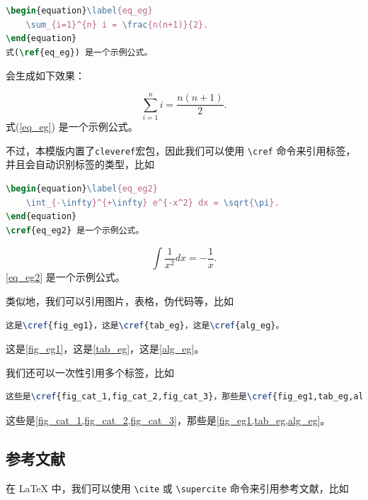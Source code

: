 \begin{lstlisting}[language=TeX]
\begin{equation}\label{eq_eg}
    \sum_{i=1}^{n} i = \frac{n(n+1)}{2}.
\end{equation}
式(\ref{eq_eg}) 是一个示例公式。
\end{lstlisting}

\noindent 会生成如下效果：

\begin{equation}\label{eq_eg}
    \sum_{i=1}^{n} i = \frac{n(n+1)}{2}.
\end{equation}
式(\ref{eq_eg}) 是一个示例公式。

不过，本模版内置了\texttt{cleveref}宏包，因此我们可以使用 \texttt{\textbackslash cref} 命令来引用标签，并且会自动识别标签的类型，比如

\begin{lstlisting}[language=TeX]
\begin{equation}\label{eq_eg2}
    \int_{-\infty}^{+\infty} e^{-x^2} dx = \sqrt{\pi}.
\end{equation}
\cref{eq_eg2} 是一个示例公式。
\end{lstlisting}

\begin{equation}\label{eq_eg2}
    \int \frac{1}{x^2} dx = -\frac{1}{x}.
\end{equation}
\cref{eq_eg2} 是一个示例公式。

类似地，我们可以引用图片，表格，伪代码等，比如

\begin{lstlisting}[language=TeX]
这是\cref{fig_eg1}，这是\cref{tab_eg}，这是\cref{alg_eg}。
\end{lstlisting}

这是\cref{fig_eg1}，这是\cref{tab_eg}，这是\cref{alg_eg}。

我们还可以一次性引用多个标签，比如

\begin{lstlisting}[language=TeX]
这些是\cref{fig_cat_1,fig_cat_2,fig_cat_3}，那些是\cref{fig_eg1,tab_eg,alg_eg}。
\end{lstlisting}

这些是\cref{fig_cat_1,fig_cat_2,fig_cat_3}，那些是\cref{fig_eg1,tab_eg,alg_eg}。

\subsection{参考文献}

在 LaTeX 中，我们可以使用 \texttt{\textbackslash cite} 或 \texttt{\textbackslash supercite} 命令来引用参考文献，比如

